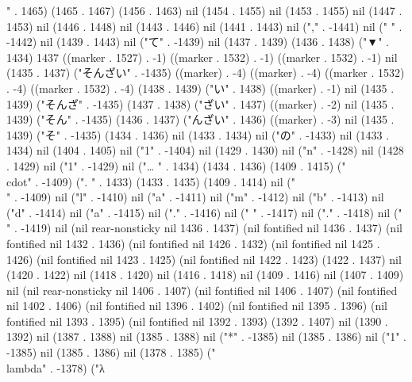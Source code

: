 " . 1465) (1465 . 1467) (1456 . 1463) nil (1454 . 1455) nil (1453 . 1455) nil (1447 . 1453) nil (1446 . 1448) nil (1443 . 1446) nil (1441 . 1443) nil ("," . -1441) nil (" " . -1442) nil (1439 . 1443) nil ("て" . -1439) nil (1437 . 1439) (1436 . 1438) ("▼" . 1434) 1437 ((marker . 1527) . -1) ((marker . 1532) . -1) ((marker . 1532) . -1) nil (1435 . 1437) ("そんざい" . -1435) ((marker) . -4) ((marker) . -4) ((marker . 1532) . -4) ((marker . 1532) . -4) (1438 . 1439) ("い" . 1438) ((marker) . -1) nil (1435 . 1439) ("そんざ" . -1435) (1437 . 1438) ("ざい" . 1437) ((marker) . -2) nil (1435 . 1439) ("そん" . -1435) (1436 . 1437) ("んざい" . 1436) ((marker) . -3) nil (1435 . 1439) ("そ" . -1435) (1434 . 1436) nil (1433 . 1434) nil ("の" . -1433) nil (1433 . 1434) nil (1404 . 1405) nil ("1" . -1404) nil (1429 . 1430) nil ("n" . -1428) nil (1428 . 1429) nil ("1" . -1429) nil ("…
" . 1434) (1434 . 1436) (1409 . 1415) ("\\cdot" . -1409) (".
" . 1433) (1433 . 1435) (1409 . 1414) nil ("\\" . -1409) nil ("l" . -1410) nil ("a" . -1411) nil ("m" . -1412) nil ("b" . -1413) nil ("d" . -1414) nil ("a" . -1415) nil ("." . -1416) nil (" " . -1417) nil ("." . -1418) nil (" " . -1419) nil (nil rear-nonsticky nil 1436 . 1437) (nil fontified nil 1436 . 1437) (nil fontified nil 1432 . 1436) (nil fontified nil 1426 . 1432) (nil fontified nil 1425 . 1426) (nil fontified nil 1423 . 1425) (nil fontified nil 1422 . 1423) (1422 . 1437) nil (1420 . 1422) nil (1418 . 1420) nil (1416 . 1418) nil (1409 . 1416) nil (1407 . 1409) nil (nil rear-nonsticky nil 1406 . 1407) (nil fontified nil 1406 . 1407) (nil fontified nil 1402 . 1406) (nil fontified nil 1396 . 1402) (nil fontified nil 1395 . 1396) (nil fontified nil 1393 . 1395) (nil fontified nil 1392 . 1393) (1392 . 1407) nil (1390 . 1392) nil (1387 . 1388) nil (1385 . 1388) nil ("*" . -1385) nil (1385 . 1386) nil ("1" . -1385) nil (1385 . 1386) nil (1378 . 1385) ("\\lambda" . -1378) ("λ
